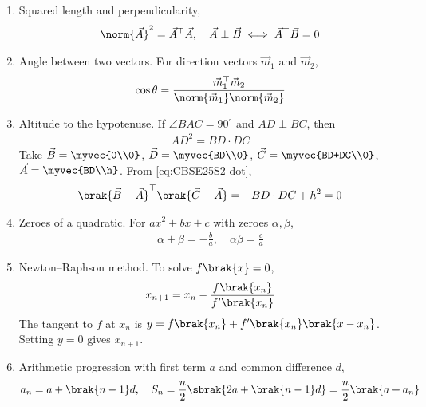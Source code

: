 \begin{enumerate}[label=\thesubsection.\arabic*, ref=\thesubsection.\theenumi]
\begin{align}
\end{align}
For $m = n$ this is the mid-point $\frac{\vec{P}+\vec{Q}}{2}$.
\item Squared length and perpendicularity,
\begin{align}
	\norm{\vec{A}}^2 = \vec{A}^{\top}\vec{A}, \quad \vec{A} \perp \vec{B} \iff \vec{A}^{\top}\vec{B} = 0 \label{eq:CBSE25S2-dot}
\end{align}
\item Angle between two vectors. For direction vectors $\vec{m}_1$ and $\vec{m}_2$,
\begin{align}
	\cos\theta = \frac{\vec{m}_1^{\top}\vec{m}_2}{\norm{\vec{m}_1}\norm{\vec{m}_2}} \label{eq:CBSE25S2-angle}
\end{align}
\item Altitude to the hypotenuse. If $\angle BAC = 90^\circ$ and $AD \perp BC$, then
\begin{align}
	AD^2 = BD \cdot DC \label{eq:CBSE25S2-altitude}
\end{align}
\solution
Take $\vec{B} = \myvec{0\\0}$, $\vec{D} = \myvec{BD\\0}$, $\vec{C} = \myvec{BD+DC\\0}$, $\vec{A} = \myvec{BD\\h}$. From \eqref{eq:CBSE25S2-dot},
\begin{align}
	\brak{\vec{B}-\vec{A}}^{\top}\brak{\vec{C}-\vec{A}} = -BD\cdot DC + h^2 = 0
\end{align}
\item Zeroes of a quadratic. For $ax^2 + bx + c$ with zeroes $\alpha, \beta$,
\begin{align}
	\alpha + \beta = -\frac{b}{a}, \quad \alpha\beta = \frac{c}{a} \label{eq:CBSE25S2-zeroes}
\end{align}
\item Newton--Raphson method. To solve $f\brak{x} = 0$,
\begin{align}
	x_{n+1} = x_n - \frac{f\brak{x_n}}{f^{\prime}\brak{x_n}} \label{eq:CBSE25S2-newton}
\end{align}
\solution
The tangent to $f$ at $x_n$ is $y = f\brak{x_n} + f^{\prime}\brak{x_n}\brak{x - x_n}$. Setting $y = 0$ gives $x_{n+1}$.
\item Arithmetic progression with first term $a$ and common difference $d$,
\begin{align}
	a_n = a + \brak{n-1}d, \quad S_n = \frac{n}{2}\sbrak{2a + \brak{n-1}d} = \frac{n}{2}\brak{a + a_n} \label{eq:CBSE25S2-ap}
\end{align}

\end{enumerate}
